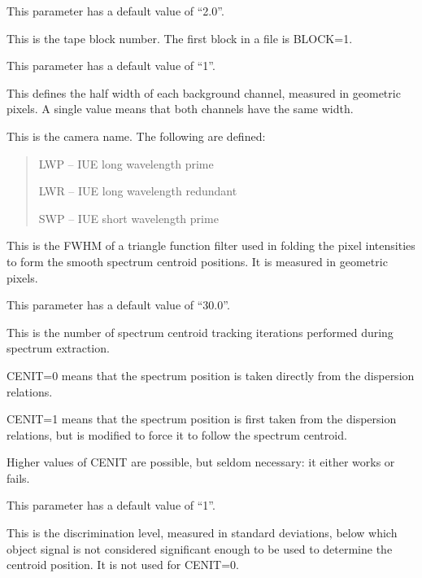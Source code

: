 \begin {description}
This parameter has a default value of ``2.0''.

\item [BLOCK=number] This is the tape block number. The first block in
a file is BLOCK=1.

This parameter has a default value of ``1''.

\item [BSLIT=(number\{,number\})]
This defines the half width of each background channel, measured
in geometric pixels.
A single value means that both channels have the same width.

\item [CAMERA=name]
This is the camera name.
The following are defined:

\begin {quote}
\begin {description}
\item LWP -- IUE long wavelength prime
\item LWR -- IUE long wavelength redundant
\item SWP -- IUE short wavelength prime
\end {description}
\end {quote}

\item [CENAV=number]
This is the FWHM of a triangle function filter used in folding the
pixel intensities to form the smooth spectrum centroid positions.
It is measured in geometric pixels.

This parameter has a default value of ``30.0''.

\item [CENIT=number]
This is the number of spectrum centroid tracking iterations performed during
spectrum extraction.

\begin {description}
\item CENIT=0 means that the spectrum position is taken directly from the
dispersion relations.

\item CENIT=1 means that the spectrum position is first taken from the
dispersion relations, but is modified to force it to
follow the spectrum centroid.
\end {description}

Higher values of CENIT are possible, but seldom necessary:  it either
works or fails.

This parameter has a default value of ``1''.

\item [CENSD=number]
This is the discrimination level, measured in standard deviations,
below which object signal is not considered significant enough
to be used to determine the centroid position.
It is not used for CENIT=0.


\end{description}
